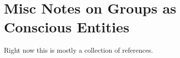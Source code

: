\chapter{Misc Notes on Groups as Conscious Entities}

Right now this is mostly a collection of references.
